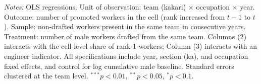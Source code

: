 \begin{table}[htbp]
\begin{threeparttable}
\begin{tabular}{lccc}
\end{tabular}
\begin{tablenotes}[flushleft]
\footnotesize
\item \textit{Notes:} OLS regressions. Unit of observation: team (kakari) $\times$ occupation $\times$ year. Outcome: number of promoted workers in the cell (rank increased from $t{-}1$ to $t$). Sample: non-drafted workers present in the same team in consecutive years. Treatment: number of male workers drafted from the same team. Columns (2) interacts with the cell-level share of rank-1 workers; Column (3) interacts with an engineer indicator. All specifications include year, section (ka), and occupation fixed effects, and control for log cumulative male baseline. Standard errors clustered at the team level. $^{***}p<0.01$, $^{**}p<0.05$, $^{*}p<0.1$.
\end{tablenotes}
\end{threeparttable}
\end{table}
